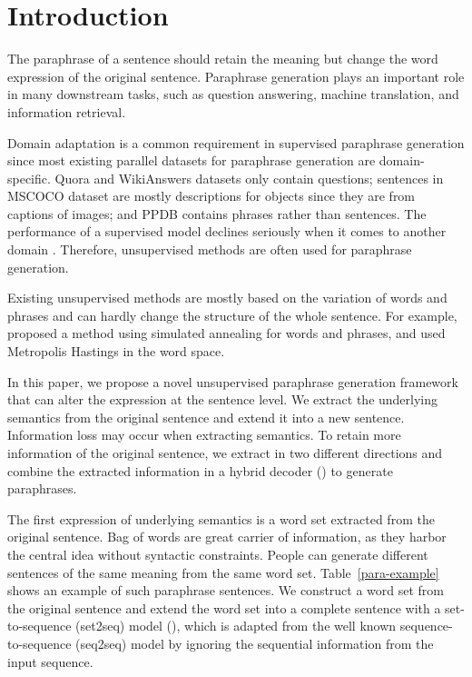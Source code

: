 \section{Introduction}
The paraphrase of a sentence should retain the meaning but change the word expression of the original sentence. Paraphrase generation plays an important role in many downstream tasks, such as question answering, machine translation, and information retrieval. 

Domain adaptation is a common requirement in supervised paraphrase generation 
since most existing parallel datasets for paraphrase generation are 
domain-specific. Quora and WikiAnswers \citep{fader2013paraphrase} datasets 
only contain questions; sentences in MSCOCO \citep{lin2014microsoft} dataset 
are mostly descriptions for objects since they are from captions of images; 
and PPDB \citep{ganitkevitch2013ppdb} contains phrases rather than sentences. 
The performance of a supervised model declines seriously when it comes to 
another domain \citep{li2019decomposable}. Therefore, unsupervised methods 
are often used for paraphrase generation.

% 

Existing unsupervised methods are mostly based on the variation of 
words and phrases and can hardly change the structure of the whole sentence. 
For example, \citet{liu2019unsupervised} proposed a method using simulated 
annealing for words and phrases, and \citet{miao2019cgmh} used Metropolis Hastings in the word space. 

In this paper, we propose a novel unsupervised paraphrase generation 
framework that can alter the expression at the sentence level. 
We extract the underlying semantics from the original sentence and 
extend it into a new sentence. Information loss may occur when 
extracting semantics. To retain more information of the original sentence, 
we extract in two different directions and combine the extracted 
information in a hybrid decoder 
() to generate paraphrases.

The first expression of underlying semantics is a word set extracted 
from the original sentence. Bag of words are great carrier of information, 
as they harbor the central idea without syntactic constraints. 
People can generate different sentences of the same meaning from 
the same word set. Table~\ref{para-example} shows an example of such 
paraphrase sentences. We construct a word set from the 
original sentence and extend the word set into a complete sentence 
with a set-to-sequence (set2seq) model (), 
which is adapted from the well known sequence-to-sequence (seq2seq) model by ignoring the sequential information from the input sequence.

